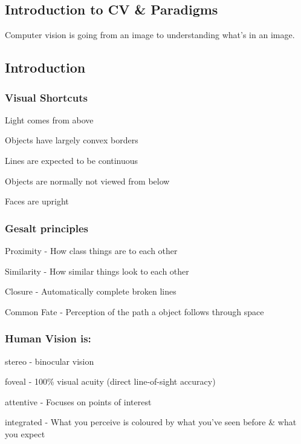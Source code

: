 \documentclass[8pt]{extarticle}
\begin{document}
\begin{multicols}{2}
\section{Introduction to CV \& Paradigms}
Computer vision is going from an image to understanding what's in an image.

\subsection{Introduction}
\subsubsection{Visual Shortcuts}
\begin{compactitem}
    \item Light comes from above
    \item Objects have largely convex borders
    \item Lines are expected to be continuous
    \item Objects are normally not viewed from below
    \item Faces are upright
\end{compactitem}

\subsubsection{Gesalt principles}
\begin{compactitem}
    \item Proximity - How class things are to each other
    \item Similarity - How similar things look to each other
    \item Closure - Automatically complete broken lines
    \item Common Fate - Perception of the path a object follows through space
\end{compactitem}

\subsubsection{Human Vision is:}
\begin{compactitem}
    \item stereo - binocular vision
    \item foveal - 100\% visual acuity (direct line-of-sight accuracy)
    \item attentive - Focuses on points of interest
    \item integrated - What you perceive is coloured by what you've seen before \& what you expect
\end{compactitem}



\end{multicols}
\end{document}

